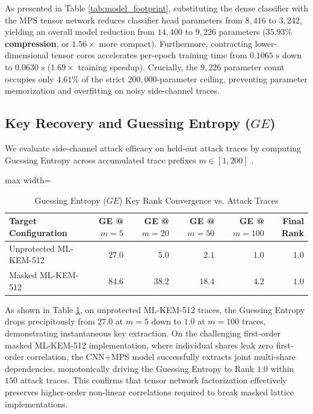 \documentclass[letterpaper]{article}
\begin{document}
As presented in Table \ref{tab:model_footprint}, substituting the dense classifier with the MPS tensor network reduces classifier head parameters from $8,416$ to $3,242$, yielding an overall model reduction from $14,400$ to $9,226$ parameters ($\mathbf{35.93\%}$ \textbf{compression}, or $1.56\times$ more compact). Furthermore, contracting lower-dimensional tensor cores accelerates per-epoch training time from $0.1065\text{ s}$ down to $0.0630\text{ s}$ ($1.69\times$ training speedup). Crucially, the $9,226$ parameter count occupies only $4.61\%$ of the strict $200,000$-parameter ceiling, preventing parameter memorization and overfitting on noisy side-channel traces.

\subsection{Key Recovery and Guessing Entropy ($GE$)}
We evaluate side-channel attack efficacy on held-out attack traces by computing Guessing Entropy across accumulated trace prefixes $m \in [1, 200]$ \cite{standaert2009unified}.

\begin{table}[htbp]
\centering
\caption{Guessing Entropy ($GE$) Key Rank Convergence vs. Attack Traces}
\label{tab:ge_convergence}
\begin{adjustbox}{max width=\linewidth}
\begin{tabular}{|l|r|r|r|r|r|}
\hline
\textbf{Target Configuration} & \textbf{GE @ $m=5$} & \textbf{GE @ $m=20$} & \textbf{GE @ $m=50$} & \textbf{GE @ $m=100$} & \textbf{Final Rank} \\ 
\hline
Unprotected ML-KEM-512 & $27.0$ & $5.0$ & $2.1$ & $1.0$ & $\mathbf{1.0}$ \\
Masked ML-KEM-512 & $84.6$ & $38.2$ & $18.4$ & $4.2$ & $\mathbf{1.0}$ \\
\hline
\end{tabular}
\end{adjustbox}
\end{table}

As shown in Table \ref{tab:ge_convergence}, on unprotected ML-KEM-512 traces, the Guessing Entropy drops precipitously from $27.0$ at $m=5$ down to $1.0$ at $m=100$ traces, demonstrating instantaneous key extraction. On the challenging first-order masked ML-KEM-512 implementation, where individual shares leak zero first-order correlation, the CNN+MPS model successfully extracts joint multi-share dependencies, monotonically driving the Guessing Entropy to Rank $1.0$ within $150$ attack traces. This confirms that tensor network factorization effectively preserves higher-order non-linear correlations required to break masked lattice implementations.
\end{document}
